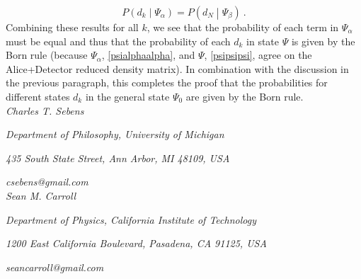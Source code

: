 \documentclass[12pt,onecolumn,secnumarabic,amsmath,amssymb,balancelastpage,nofootinbib]{article}
\begin{document}
\begin{equation}
P\left(d_k\middle|\Psi_\alpha\right)=P\left(d_N\middle|\Psi_\beta\right)\ .
\end{equation}
Combining these results for all $k$, we see that the probability of each term in $\Psi_\alpha$ must be equal and thus that the probability of each $d_k$ in state $\Psi$ is given by the Born rule (because $\Psi_\alpha$, \eqref{psialphaalpha}, and $\Psi$, \eqref{psipsipsi}, agree on the Alice+Detector reduced density matrix).  In combination with the discussion in the previous paragraph, this completes the proof that the probabilities for different states $d_k$ in the general state $\Psi_0$ are given by the Born rule.\\

\hfill \textit{Charles T. Sebens}

\hfill \textit{Department of Philosophy, University of Michigan}

\hfill \textit{435 South State Street, Ann Arbor, MI 48109, USA}

\hfill \textit{csebens@gmail.com}\\

\hfill \textit{Sean M. Carroll}

\hfill \textit{Department of Physics, California Institute of Technology}

\hfill \textit{1200 East California Boulevard, Pasadena, CA 91125, USA}

\hfill \textit{seancarroll@gmail.com}



\end{document}
